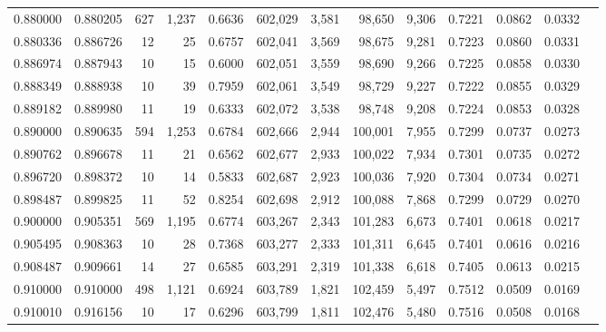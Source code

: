 \begin{tabular}{rrrrrrrrrrrrr}
0.880000 & 0.880205 &    627 & 1,237 &                                     0.6636 & 602,029 &   3,581 &  98,650 &   9,306 & 0.7221 & 0.0862 & 0.0332 \\
0.880336 & 0.886726 &     12 &    25 &                                     0.6757 & 602,041 &   3,569 &  98,675 &   9,281 & 0.7223 & 0.0860 & 0.0331 \\
0.886974 & 0.887943 &     10 &    15 &                                     0.6000 & 602,051 &   3,559 &  98,690 &   9,266 & 0.7225 & 0.0858 & 0.0330 \\
0.888349 & 0.888938 &     10 &    39 &                                     0.7959 & 602,061 &   3,549 &  98,729 &   9,227 & 0.7222 & 0.0855 & 0.0329 \\
0.889182 & 0.889980 &     11 &    19 &                                     0.6333 & 602,072 &   3,538 &  98,748 &   9,208 & 0.7224 & 0.0853 & 0.0328 \\
0.890000 & 0.890635 &    594 & 1,253 &                                     0.6784 & 602,666 &   2,944 & 100,001 &   7,955 & 0.7299 & 0.0737 & 0.0273 \\
0.890762 & 0.896678 &     11 &    21 &                                     0.6562 & 602,677 &   2,933 & 100,022 &   7,934 & 0.7301 & 0.0735 & 0.0272 \\
0.896720 & 0.898372 &     10 &    14 &                                     0.5833 & 602,687 &   2,923 & 100,036 &   7,920 & 0.7304 & 0.0734 & 0.0271 \\
0.898487 & 0.899825 &     11 &    52 &                                     0.8254 & 602,698 &   2,912 & 100,088 &   7,868 & 0.7299 & 0.0729 & 0.0270 \\
0.900000 & 0.905351 &    569 & 1,195 &                                     0.6774 & 603,267 &   2,343 & 101,283 &   6,673 & 0.7401 & 0.0618 & 0.0217 \\
0.905495 & 0.908363 &     10 &    28 &                                     0.7368 & 603,277 &   2,333 & 101,311 &   6,645 & 0.7401 & 0.0616 & 0.0216 \\
0.908487 & 0.909661 &     14 &    27 &                                     0.6585 & 603,291 &   2,319 & 101,338 &   6,618 & 0.7405 & 0.0613 & 0.0215 \\
0.910000 & 0.910000 &    498 & 1,121 &                                     0.6924 & 603,789 &   1,821 & 102,459 &   5,497 & 0.7512 & 0.0509 & 0.0169 \\
0.910010 & 0.916156 &     10 &    17 &                                     0.6296 & 603,799 &   1,811 & 102,476 &   5,480 & 0.7516 & 0.0508 & 0.0168 \\

\end{tabular}
